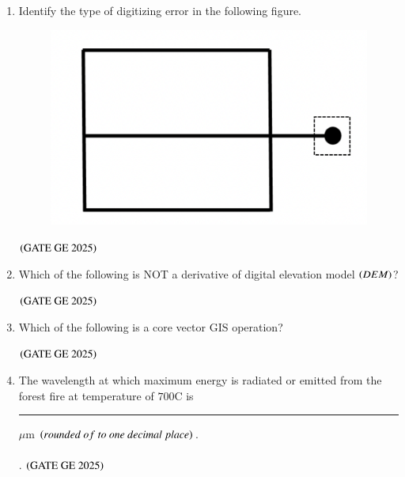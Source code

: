 \documentclass[journal,12pt,onecolumn]{IEEEtran}
\theoremstyle{remark}
\begin{document}
\begin{enumerate}
\begin{enumerate}
\begin{multicols}{4}
\end{multicols}
\end{enumerate}
\hfill $\brak{\text{GATE GE 2025}}$
\bigskip
\item Identify the type of digitizing error in the following figure.
\\
\begin{figure}[H]
    \centering
    \includegraphics[width=0.25\columnwidth]{figs/fig4.png}
    \caption{}
    \label{figs:fig4}
\end{figure}

\begin{enumerate}
\end{enumerate}
\hfill $\brak{\text{GATE GE 2025}}$
\bigskip
\item Which of the following is NOT a derivative of digital elevation model $\left(DEM\right)$?
\begin{enumerate}
\end{enumerate}
\hfill $\brak{\text{GATE GE 2025}}$
\bigskip
\item Which of the following is a core vector GIS operation?
\begin{enumerate}
\end{enumerate}
\hfill $\brak{\text{GATE GE 2025}}$
\bigskip
\item The wavelength at which maximum energy is radiated or emitted from the forest fire at temperature of $700$\degree C is \rule{2cm}{0.5mm} $\mu$m $\brak{rounded\ of\ to\ one\ decimal\ place}$.
\\
\\.
\hfill $\brak{\text{GATE GE 2025}}$
\bigskip


\end{enumerate}
\end{document}

